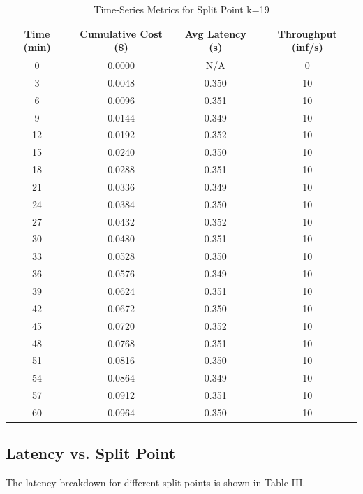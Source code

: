 \documentclass[conference]{IEEEtran}
\begin{document}
\begin{table}[h]
  \caption{Time-Series Metrics for Split Point k=19}
  \begin{center}
    \begin{tabular}{|c|c|c|c|}
      \hline
      \textbf{Time (min)} & \textbf{Cumulative Cost (\$)} & \textbf{Avg Latency (s)} & \textbf{Throughput (inf/s)} \\
      \hline
      0 & 0.0000 & N/A & 0 \\
      3 & 0.0048 & 0.350 & 10 \\
      6 & 0.0096 & 0.351 & 10 \\
      9 & 0.0144 & 0.349 & 10 \\
      12 & 0.0192 & 0.352 & 10 \\
      15 & 0.0240 & 0.350 & 10 \\
      18 & 0.0288 & 0.351 & 10 \\
      21 & 0.0336 & 0.349 & 10 \\
      24 & 0.0384 & 0.350 & 10 \\
      27 & 0.0432 & 0.352 & 10 \\
      30 & 0.0480 & 0.351 & 10 \\
      33 & 0.0528 & 0.350 & 10 \\
      36 & 0.0576 & 0.349 & 10 \\
      39 & 0.0624 & 0.351 & 10 \\
      42 & 0.0672 & 0.350 & 10 \\
      45 & 0.0720 & 0.352 & 10 \\
      48 & 0.0768 & 0.351 & 10 \\
      51 & 0.0816 & 0.350 & 10 \\
      54 & 0.0864 & 0.349 & 10 \\
      57 & 0.0912 & 0.351 & 10 \\
      60 & 0.0964 & 0.350 & 10 \\
      \hline
    \end{tabular}
  \end{center}
  \label{tab:timeseries}
\end{table}

\subsection{Latency vs. Split Point}
The latency breakdown for different split points is shown in Table III.
\end{document}
